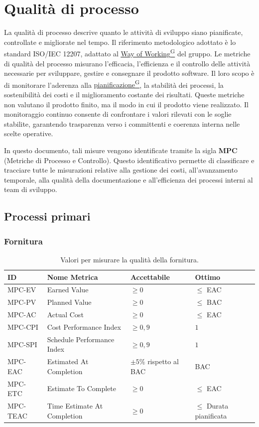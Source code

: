 \documentclass[a4paper,12pt]{article}
\providecommand{\glslink}[2]{\href{https://alittlebyte-19.github.io/Documentazione/glossario.html\#gls-#1}{\underline{#2}\textsuperscript{\scriptsize G}}}
\begin{document}
\section{Qualità di processo}
La qualità di processo descrive quanto le attività di sviluppo siano pianificate, controllate e migliorate nel tempo. Il riferimento metodologico adottato è lo standard ISO/IEC 12207, adattato al \glslink{way-of-working-wow}{Way of Working} del gruppo.
Le metriche di qualità del processo misurano l'efficacia, l'efficienza e il controllo delle attività necessarie per sviluppare, gestire e consegnare il prodotto software. Il loro scopo è di monitorare l'aderenza alla \glslink{pianificazione}{pianificazione}, la stabilità dei processi, la sostenibilità dei costi e il miglioramento costante dei risultati. Queste metriche non valutano il prodotto finito, ma il modo in cui il prodotto viene realizzato.
Il monitoraggio continuo consente di confrontare i valori rilevati con le soglie stabilite, garantendo trasparenza verso i committenti e coerenza interna nelle scelte operative.

In questo documento, tali misure vengono identificate tramite la sigla \textbf{MPC} (Metriche di Processo e Controllo). Questo identificativo permette di classificare e tracciare tutte le misurazioni relative alla gestione dei costi, all'avanzamento temporale, alla qualità della documentazione e all'efficienza dei processi interni al team di sviluppo.

\subsection{Processi primari}
\subsubsection{Fornitura}
\begin{table}[H]
    \centering
    \renewcommand{\arraystretch}{1.2}
    \begin{tabularx}{\textwidth}{|p{2.4cm}|X|p{3cm}|p{3cm}|}
        \hline
        \rowcolor{gray!20}
        \textbf{ID} & \textbf{Nome Metrica} & \textbf{Accettabile} & \textbf{Ottimo} \\
        \hline
        MPC-EV & Earned Value & $\geq 0$ & $\leq$ EAC \\
        MPC-PV & Planned Value & $\geq 0$ & $\leq$ BAC \\
        MPC-AC & Actual Cost & $\geq 0$ & $\leq$ EAC \\
        MPC-CPI & Cost Performance Index & $\geq 0,9$ & $1$ \\
        MPC-SPI & Schedule Performance Index & $\geq 0,9$ & $1$ \\
        MPC-EAC & Estimated At Completion & $\pm 5\%$ rispetto al BAC & BAC \\
        MPC-ETC & Estimate To Complete & $\geq 0$ & $\leq$ EAC \\
        MPC-TEAC & Time Estimate At Completion & $\geq 0$ & $\leq$ Durata pianificata \\
        \hline
    \end{tabularx}
    \caption{Valori per misurare la qualità della fornitura.}
\end{table}
\end{document}
